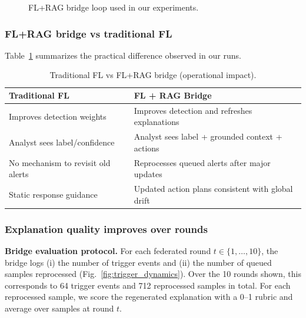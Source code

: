 \documentclass[conference]{IEEEtran}
\begin{document}
\begin{figure}[t]
\centering
{}
\caption{FL+RAG bridge loop used in our experiments.}
\label{fig:rag_update_process}
\end{figure}

\subsubsection{FL+RAG bridge vs traditional FL}
Table~\ref{tab:flrag_vs_trad} summarizes the practical difference observed in our runs.

\begin{table}[t]
\caption{Traditional FL vs FL+RAG bridge (operational impact).}
\label{tab:flrag_vs_trad}
\centering
\begin{tabular}{p{}p{}}
\toprule
\textbf{Traditional FL} & \textbf{FL + RAG Bridge}\\
\midrule
Improves detection weights & Improves detection and refreshes explanations\\
Analyst sees label/confidence & Analyst sees label + grounded context + actions\\
No mechanism to revisit old alerts & Reprocesses queued alerts after major updates\\
Static response guidance & Updated action plans consistent with global drift\\
\bottomrule
\end{tabular}
\end{table}

\subsubsection{Explanation quality improves over rounds}
\textbf{Bridge evaluation protocol.} For each federated round $t\in\{1,\dots,10\}$, the bridge logs (i) the number of trigger events and (ii) the number of queued samples reprocessed (Fig.~\ref{fig:trigger_dynamics}). Over the 10 rounds shown, this corresponds to 64 trigger events and 712 reprocessed samples in total. For each reprocessed sample, we score the regenerated explanation with a 0--1 rubric and average over samples at round $t$.
\end{document}
